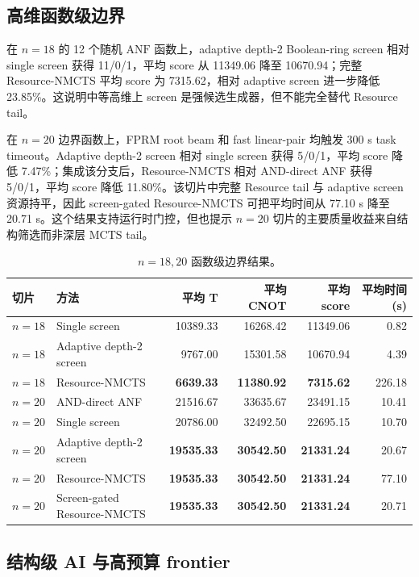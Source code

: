 \documentclass[UTF8,fontset=macnew,11pt]{ctexart}
\newcommand{\method}{Resource-NMCTS}
\newcommand{\screen}{Boolean-ring screen}
\newcommand{\anf}{\ensuremath{\mathrm{ANF}}}
\newcommand{\mcts}{\ensuremath{\mathrm{MCTS}}}
\begin{document}
\subsection{高维函数级边界}

在 $n=18$ 的 12 个随机 \anf{} 函数上，adaptive depth-2 \screen{} 相对 single screen 获得 11/0/1，平均 score 从 11349.06 降至 10670.94；完整 \method{} 平均 score 为 7315.62，相对 adaptive screen 进一步降低 23.85\%。这说明中等高维上 screen 是强候选生成器，但不能完全替代 Resource tail。

在 $n=20$ 边界函数上，FPRM root beam 和 fast linear-pair 均触发 300 s task timeout。Adaptive depth-2 screen 相对 single screen 获得 5/0/1，平均 score 降低 7.47\%；集成该分支后，\method{} 相对 AND-direct ANF 获得 5/0/1，平均 score 降低 11.80\%。该切片中完整 Resource tail 与 adaptive screen 资源持平，因此 screen-gated \method{} 可把平均时间从 77.10 s 降至 20.71 s。这个结果支持运行时门控，但也提示 $n=20$ 切片的主要质量收益来自结构筛选而非深层 \mcts{} tail。

\begin{table}[H]
\centering
\scriptsize
\caption{$n=18,20$ 函数级边界结果。}
\label{tab:highdim}
\begin{tabular}{llrrrr}
\toprule
切片 & 方法 & 平均 T & 平均 CNOT & 平均 score & 平均时间(s) \\
\midrule
$n=18$ & Single screen & 10389.33 & 16268.42 & 11349.06 & 0.82 \\
$n=18$ & Adaptive depth-2 screen & 9767.00 & 15301.58 & 10670.94 & 4.39 \\
$n=18$ & \method{} & \textbf{6639.33} & \textbf{11380.92} & \textbf{7315.62} & 226.18 \\
$n=20$ & AND-direct ANF & 21516.67 & 33635.67 & 23491.15 & 10.41 \\
$n=20$ & Single screen & 20786.00 & 32492.50 & 22695.15 & 10.70 \\
$n=20$ & Adaptive depth-2 screen & \textbf{19535.33} & \textbf{30542.50} & \textbf{21331.24} & 20.67 \\
$n=20$ & \method{} & \textbf{19535.33} & \textbf{30542.50} & \textbf{21331.24} & 77.10 \\
$n=20$ & Screen-gated \method{} & \textbf{19535.33} & \textbf{30542.50} & \textbf{21331.24} & 20.71 \\
\bottomrule
\end{tabular}
\end{table}

\subsection{结构级 AI 与高预算 frontier}
\end{document}
